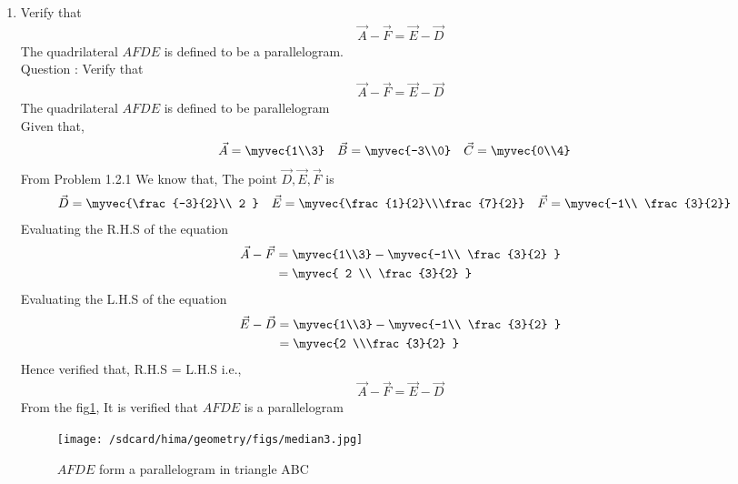 \documentclass[11pt]{book}
\begin{document}
\begin{enumerate}[label=\thesection.\arabic*.,ref=\thesection.\theenumi]
\item Verify that 
		\begin{align}
\vec{A}-\vec{F}=\vec{E}-\vec{D}
		\end{align}
The quadrilateral $AFDE$ is defined to be a parallelogram.\\
Question : Verify that 
\begin{align}
	\vec{A}-\vec{F} = \vec{E}-\vec{D}
\end{align}
The quadrilateral $AFDE$ is defined to be parallelogram
\\ \solution 
Given that,
\begin{align}
    \vec{A} = \myvec{1\\3}
    \quad
    \vec{B} &= \myvec{-3\\0}
    \quad
    \vec{C} = \myvec{0\\4}
\end{align}
From Problem 1.2.1 We know that, The point $\vec{D},\vec{E},\vec{F}$ is 
\begin{align}
    \vec{D} = \myvec{\frac{-3}{2}\\ 2 }
    \quad
    \vec{E} &= \myvec{\frac{1}{2}\\\frac{7}{2}}
    \quad
    \vec{F} = \myvec{-1\\ \frac{3}{2}}
\end{align}
Evaluating the R.H.S of the equation
\begin{align}
    \vec{A}-\vec{F}&=\myvec{1\\3}-\myvec{-1\\ \frac{3}{2} }\\
    &=\myvec{ 2 \\ \frac{3}{2} }
\end{align} 
Evaluating the L.H.S of the equation
\begin{align}
    \vec{E}-\vec{D}&=\myvec{1\\3}-\myvec{-1\\ \frac{3}{2} }\\
    &=\myvec{2 \\\frac{3}{2} }
\end{align}
Hence verified that, R.H.S = L.H.S i.e.,
\begin{align}
	\vec{A}-\vec{F} = \vec{E}-\vec{D}
\end{align}
From the fig\ref{fig:Triangle}, It is verified that $AFDE$ is a parallelogram
\begin{figure}
\centering
\texttt{[image: /sdcard/hima/geometry/figs/median3.jpg]}
\caption{$AFDE$ form a parallelogram in triangle ABC}
\label{fig:Triangle}
\end{figure}
\end{enumerate}
\end{document}
